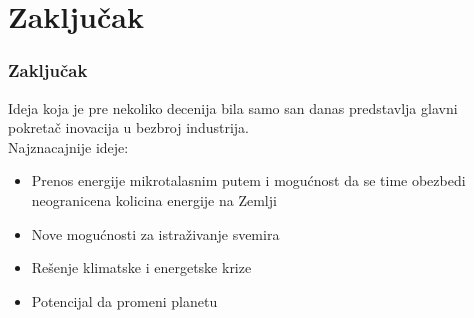 \documentclass[10pt]{beamer}
\begin{document}
\section{Zaključak}

\begin{frame}\frametitle{Zaključak}
	Ideja koja je pre nekoliko decenija bila samo san danas predstavlja glavni pokretač inovacija u bezbroj industrija.\\
	Najznacajnije ideje:\\
	\begin{itemize}
		\item Prenos energije mikrotalasnim putem i mogućnost da se time obezbedi neogranicena kolicina energije na Zemlji 
		\item Nove mogućnosti za istraživanje svemira
		\item Rešenje klimatske i energetske krize
		\item Potencijal da promeni planetu
	\end{itemize}
\end{frame}
\end{document}
